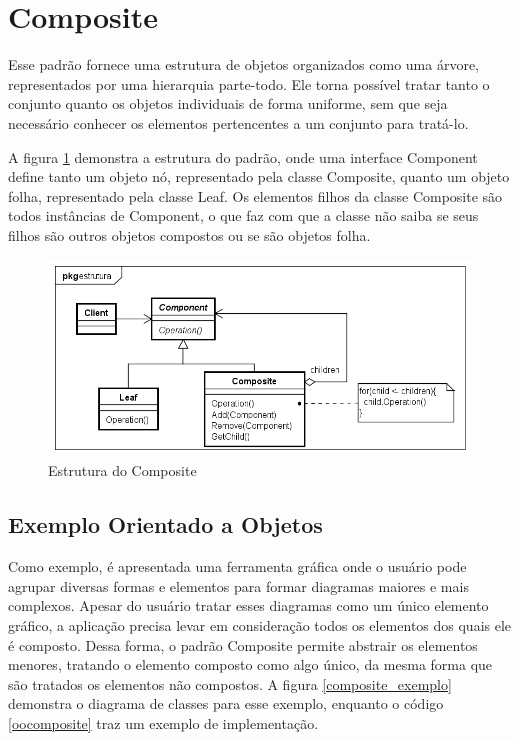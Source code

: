 \section{Composite}

Esse padrão fornece uma estrutura de objetos 
organizados como uma árvore, representados 
por uma hierarquia parte-todo. 
Ele torna possível tratar tanto o conjunto 
quanto os objetos individuais de forma 
uniforme, sem que seja necessário conhecer 
os elementos pertencentes a um conjunto para 
tratá-lo.

A figura \ref{composite_struct} demonstra a 
estrutura do padrão, onde uma interface Component 
define tanto um objeto nó, representado pela 
classe Composite, quanto um objeto folha, 
representado pela classe Leaf. Os elementos 
filhos da classe Composite são todos instâncias 
de Component, o que faz com que a classe não 
saiba se seus filhos são outros objetos compostos 
ou se são objetos folha.

\begin{figure}[htb]
	\caption{\label{composite_struct}Estrutura do Composite}
	\begin{center}
	    \includegraphics[scale=0.5]{5_padroes-contexto-funcional/5.2_estruturais/5.2.3_composite/composite_estrutura.png}
	\end{center}
\end{figure}

\subsection*{Exemplo Orientado a Objetos}

Como exemplo, é apresentada uma ferramenta gráfica 
onde o usuário pode agrupar diversas formas e 
elementos 
para formar diagramas maiores e mais complexos. 
Apesar do usuário tratar esses diagramas como um 
único elemento gráfico, a aplicação precisa levar 
em consideração todos os elementos dos quais ele 
é composto. Dessa forma, o padrão Composite permite 
abstrair os elementos menores, tratando o elemento 
composto como algo único, da mesma forma que 
são tratados os elementos não compostos. A figura 
\ref{composite_exemplo} demonstra o diagrama de 
classes para esse exemplo, enquanto o código 
\ref{oocomposite} traz um exemplo de implementação.

